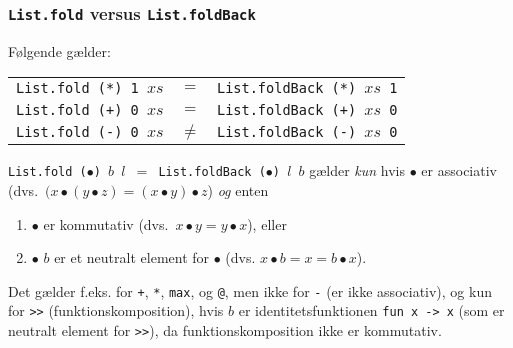 \documentclass{beamer}
\begin{document}
\begin{frame}[fragile=singleslide]
\frametitle{\texttt{List.fold} versus \texttt{List.foldBack}}

Følgende gælder:
\vspace{1ex}
\begin{tabular}{rcl}
\texttt{List.fold (*) 1 $xs$} &$=$& \texttt{List.foldBack (*) $xs$ 1}\\
\texttt{List.fold (+) 0 $xs$}  &$=$& \texttt{List.foldBack (+) $xs$ 0}\\
\texttt{List.fold (-) 0 $xs$}  &$\neq$& \texttt{List.foldBack (-) $xs$ 0}
\end{tabular}

\vspace{2ex}

\texttt{List.fold ($\bullet$) $b$ $l$ $=$ List.foldBack ($\bullet$)
  $l$ $b$} gælder \emph{kun} hvis $\bullet$ er associativ
(dvs.\ $(x\bullet (y \bullet z) = (x\bullet y) \bullet z$) \emph{og}
enten

\begin{enumerate}[~1.]
\item $\bullet$ er kommutativ (dvs.\ $x\bullet y = y\bullet x$), eller
\item $\bullet$ $b$ er et neutralt element for $\bullet$ (dvs. $x
  \bullet b = x = b \bullet x$).
\end{enumerate}

Det gælder f.eks. for \texttt{+}, \texttt{*}, \texttt{max}, og
\texttt{@}, men ikke for \texttt{-} (er ikke associativ), og kun for
\texttt{>>} (funktionskomposition), hvis $b$ er identitetsfunktionen
\texttt{fun x -> x} (som er neutralt element for \texttt{>>}), da
funktionskomposition ikke er kommutativ.

\end{frame}

\end{document}
